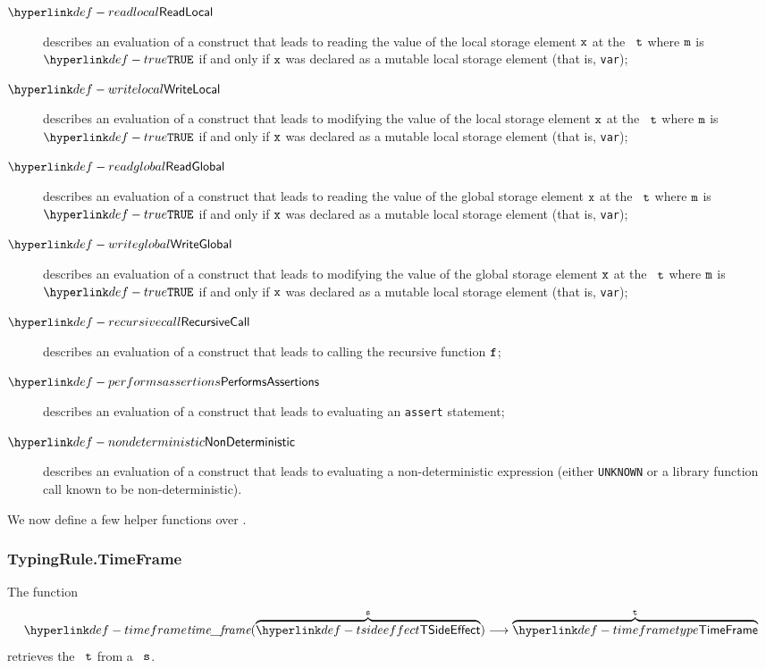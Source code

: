 \begin{description}
    \item[$\ReadLocal$] describes an evaluation of a construct that leads to reading the value of the local storage element
                        $\texttt{x}$ at the \timeframeterm\ $\texttt{t}$ where $\texttt{m}$ is $\True$ if and only if $\texttt{x}$
                        was declared as a mutable local storage element (that is, \texttt{var});
    \item[$\WriteLocal$] describes an evaluation of a construct that leads to modifying the value of the local storage element
        $\texttt{x}$ at the \timeframeterm\ $\texttt{t}$ where $\texttt{m}$ is $\True$ if and only if $\texttt{x}$
        was declared as a mutable local storage element (that is, \texttt{var});
    \item[$\ReadGlobal$] describes an evaluation of a construct that leads to reading the value of the global storage element
        $\texttt{x}$ at the \timeframeterm\ $\texttt{t}$ where $\texttt{m}$ is $\True$ if and only if $\texttt{x}$
        was declared as a mutable local storage element (that is, \texttt{var});
    \item[$\WriteGlobal$] describes an evaluation of a construct that leads to modifying the value of the global storage element
        $\texttt{x}$ at the \timeframeterm\ $\texttt{t}$ where $\texttt{m}$ is $\True$ if and only if $\texttt{x}$
        was declared as a mutable local storage element (that is, \texttt{var});
    \item[$\RecursiveCall$] describes an evaluation of a construct that leads to calling the recursive function $\texttt{f}$;
    \item[$\PerformsAssertions$] describes an evaluation of a construct that leads to evaluating an \texttt{assert} statement;
    \item[$\NonDeterministic$] describes an evaluation of a construct that leads to evaluating a non-deterministic
        expression (either \texttt{UNKNOWN} or a library function call known to be non-deterministic).
\end{description}

We now define a few helper functions over \timeframesterm.

\subsubsection{TypingRule.TimeFrame\label{sec:TypingRule.TimeFrame}}
\hypertarget{def-timeframe}{}
The function
\[
    \timeframe(\overname{\TSideEffect}{\vs}) \aslto \overname{\TTimeFrame}{\vt}
\]
retrieves the \timeframeterm\ $\texttt{t}$ from a \sideeffectdescriptorterm\ $\texttt{s}$.

